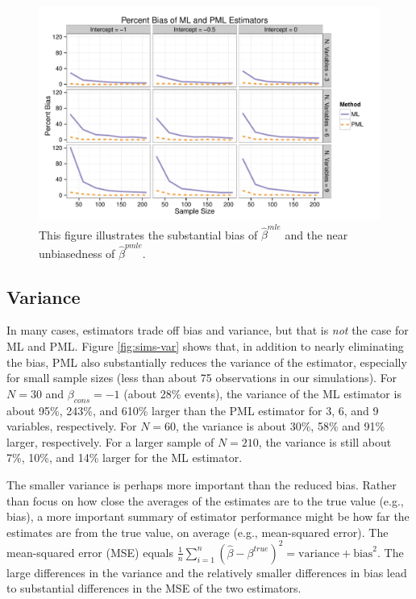 \documentclass[12pt]{article}
\begin{document}
\begin{figure}[h]
\begin{center}
\includegraphics[width = \textwidth]{figs/sims-percent-bias.pdf}
\caption{This figure illustrates the substantial bias of $\hat{\beta}^{mle}$ and the near unbiasedness of $\hat{\beta}^{pmle}$.}\label{fig:sims-coef-perc-bias}
\end{center}
\end{figure}

\subsection*{Variance}

In many cases, estimators trade off bias and variance, but that is \textit{not} the case for ML and PML. 
Figure \ref{fig:sims-var} shows that, in addition to nearly eliminating the bias, PML also substantially reduces the variance of the estimator, especially for small sample sizes (less than about 75 observations in our simulations). 
For $N = 30$ and $\beta_{cons} = -1$ (about 28\% events), the variance of the ML estimator is about 95\%, 243\%, and 610\% larger than the PML estimator for 3, 6, and 9 variables, respectively. 
For $N = 60$, the variance is about 30\%, 58\% and 91\% larger, respectively. For a larger sample of $N = 210$, the variance is still about 7\%, 10\%, and 14\% larger for the ML estimator. 

The smaller variance is perhaps more important than the reduced bias.
Rather than focus on how close the averages of the estimates are to the true value (e.g., bias), a more important summary of estimator performance might be how far the estimates are from the true value, on average (e.g., mean-squared error).
The mean-squared error (MSE) equals $\frac{1}{n}\sum_{i=1}^n(\hat{\beta} - \beta^{true})^2 = \text{variance} + \text{bias}^2$.
The large differences in the variance and the relatively smaller differences in bias lead to substantial differences in the MSE of the two estimators.
\end{document}
